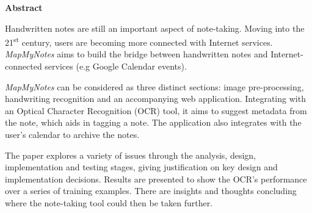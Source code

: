 \thispagestyle{empty}

\begin{center}
    {\LARGE\bf Abstract}
\end{center}


Handwritten notes are still an important aspect of note-taking. Moving into the 21\textsuperscript{st} century, users are becoming more connected with Internet services. \textit{MapMyNotes} aims to build the bridge between handwritten notes and Internet-connected services (e.g Google Calendar events).

\textit{MapMyNotes} can be considered as three distinct sections: image pre-processing, handwriting recognition and an accompanying web application. Integrating with an Optical Character Recognition (OCR) tool, it aims to suggest metadata from the note, which aids in tagging a note. The application also integrates with the user's calendar to archive the notes.

The paper explores a variety of issues through the analysis, design, implementation and testing stages, giving justification on key design and implementation decisions. Results are presented to show the OCR's performance over a series of training examples. There are insights and thoughts concluding where the note-taking tool could then be taken further.
